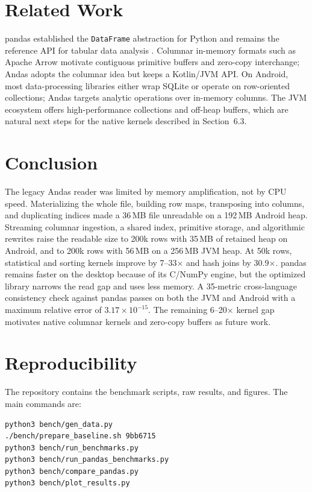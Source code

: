 \documentclass[11pt,a4paper]{article}
\newcommand{\code}[1]{\texttt{#1}}
\begin{document}
\section{Related Work}

pandas established the \code{DataFrame} abstraction for Python and remains the reference API for
tabular data analysis \cite{pandas}.  Columnar in-memory formats such as Apache Arrow \cite{arrow}
motivate contiguous primitive buffers and zero-copy interchange; Andas adopts the columnar idea but
keeps a Kotlin/JVM API.  On Android, most data-processing libraries either wrap SQLite or operate on
row-oriented collections; Andas targets analytic operations over in-memory columns.  The JVM
ecosystem offers high-performance collections and off-heap buffers, which are natural next steps for
the native kernels described in Section~6.3.

\section{Conclusion}

The legacy Andas reader was limited by memory amplification, not by CPU speed.  Materializing the
whole file, building row maps, transposing into columns, and duplicating indices made a 36\,MB file
unreadable on a 192\,MB Android heap.  Streaming columnar ingestion, a shared index, primitive
storage, and algorithmic rewrites raise the readable size to 200k rows with 35\,MB of retained heap
on Android, and to 200k rows with 56\,MB on a 256\,MB JVM heap.  At 50k rows, statistical and
sorting kernels improve by 7--33$\times$ and hash joins by 30.9$\times$.  pandas remains faster on
the desktop because of its C/NumPy engine, but the optimized library narrows the read gap and uses
less memory.  A 35-metric cross-language consistency check against pandas passes on both the JVM
and Android with a maximum relative error of $3.17\times10^{-15}$.  The remaining 6--20$\times$
kernel gap motivates native columnar kernels and zero-copy buffers as future work.

\appendix
\section{Reproducibility}

The repository contains the benchmark scripts, raw results, and figures.  The main commands are:

\begin{lstlisting}[language=bash]
python3 bench/gen_data.py
./bench/prepare_baseline.sh 9bb6715
python3 bench/run_benchmarks.py
python3 bench/run_pandas_benchmarks.py
python3 bench/compare_pandas.py
python3 bench/plot_results.py
\end{lstlisting}
\end{document}
